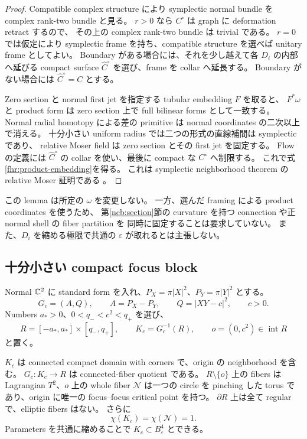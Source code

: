 \begin{proof}
Compatible complex structure により symplectic normal bundle を complex rank-two bundle と見る。
$r>0$ なら $C^\circ$ は graph に deformation retract するので、
その上の complex rank-two bundle は trivial である。
$r=0$ では仮定により symplectic frame を持ち、compatible structure を選べば unitary frame としてよい。
Boundary がある場合には、それを少し越えて各 $D_i$ の内部へ延びる compact surface
$\widehat C^\circ$ を選び、frame を collar へ延長する。
Boundary がない場合には $\widehat C^\circ=C$ とする。

Zero section と normal first jet を指定する tubular embedding $F$ を取ると、
$F^*\omega$ と product form は zero section 上で full bilinear forms として一致する。
Normal radial homotopy による差の primitive は normal coordinates の二次以上で消える。
十分小さい uniform radius では二つの形式の直線補間は symplectic であり、
relative Moser field は zero section とその first jet を固定する。
Flow の定義には $\widehat C^\circ$ の collar を使い、最後に compact な $C^\circ$ へ制限する。
これで式\eqref{fhr:product-embedding}を得る。
これは symplectic neighborhood theorem の relative Moser 証明である
\cite[Sections 7.3 and 9.2]{cds-local}。
\end{proof}

この lemma は所定の $\omega$ を変更しない。
一方、選んだ framing による product coordinates を使うため、
第\ref{ncb:section}節の curvature を持つ connection や正 normal shell の fiber partition を
同時に固定することは要求していない。
また、$D_i$ を縮める極限で共通の $\varepsilon$ が取れるとは主張しない。

\subsection{十分小さい compact focus block}

Normal $\mathbb C^2$ に standard form を入れ、$P_X=\pi|X|^2$、$P_Y=\pi|Y|^2$ とする。
\begin{equation}\label{fhr:focus-map}
 G_c=(A,Q),\qquad A=P_X-P_Y,\qquad Q=|XY-c|^2,
 \qquad c>0.
\end{equation}
Numbers $a_*>0$、$0<q_-<c^2<q_+$ を選び、
\begin{equation}\label{fhr:focus-domain}
 R=[-a_*,a_*]\times[q_-,q_+],\qquad
 K_c=G_c^{-1}(R),\qquad o=(0,c^2)\in\operatorname{int}R
\end{equation}
と置く。

\begin{lemma}\label{fhr:focus-block}
$K_c$ は connected compact domain with corners で、origin の neighborhood を含む。
$G_c:K_c\to R$ は connected-fiber quotient である。
$R\setminus\{o\}$ 上の fibers は Lagrangian $T^2$、$o$ 上の whole fiber
$\mathcal N$ は一つの circle を pinching した torus であり、origin に唯一の focus--focus critical point を持つ。
$\partial R$ 上は全て regular で、elliptic fibers はない。
さらに
\begin{equation}\label{fhr:normal-euler}
 \chi(K_c)=\chi(\mathcal N)=1.
\end{equation}
Parameters を共通に縮めることで $K_c\subset B^4_\varepsilon$ とできる。
\end{lemma}


